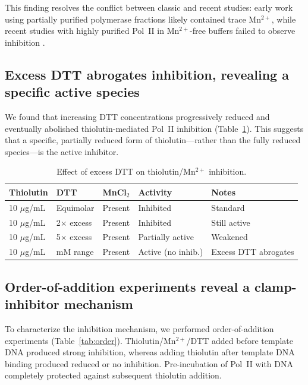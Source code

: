 \documentclass[11pt,a4paper]{article}
\begin{document}
This finding resolves the conflict between classic and recent studies: early work using partially purified polymerase fractions likely contained trace Mn$^{2+}$, while recent studies with highly purified Pol~II in Mn$^{2+}$-free buffers failed to observe inhibition \citep{Tipper1973, Lauber2016}.

\subsection{Excess DTT abrogates inhibition, revealing a specific active species}

We found that increasing DTT concentrations progressively reduced and eventually abolished thiolutin-mediated Pol~II inhibition (Table~\ref{tab:dtt}). This suggests that a specific, partially reduced form of thiolutin---rather than the fully reduced species---is the active inhibitor.

\begin{table}[htbp]
\centering
\caption{Effect of excess DTT on thiolutin/Mn$^{2+}$ inhibition.}
\label{tab:dtt}
\begin{tabular}{lllll}
\toprule
\textbf{Thiolutin} & \textbf{DTT} & \textbf{MnCl$_2$} & \textbf{Activity} & \textbf{Notes} \\
\midrule
10 $\mu$g/mL & Equimolar & Present & Inhibited & Standard \\
10 $\mu$g/mL & 2$\times$ excess & Present & Inhibited & Still active \\
10 $\mu$g/mL & 5$\times$ excess & Present & Partially active & Weakened \\
10 $\mu$g/mL & mM range & Present & Active (no inhib.) & Excess DTT abrogates \\
\bottomrule
\end{tabular}
\end{table}

\subsection{Order-of-addition experiments reveal a clamp-inhibitor mechanism}

To characterize the inhibition mechanism, we performed order-of-addition experiments (Table~\ref{tab:order}). Thiolutin/Mn$^{2+}$/DTT added before template DNA produced strong inhibition, whereas adding thiolutin after template DNA binding produced reduced or no inhibition. Pre-incubation of Pol~II with DNA completely protected against subsequent thiolutin addition.
\end{document}
